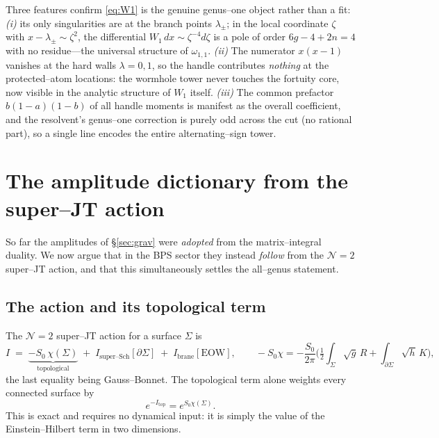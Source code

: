\documentclass[11pt]{article}
\begin{document}
Three features confirm \eqref{eq:W1} is the genuine genus--one object rather than a fit:
\emph{(i)} its only singularities are at the branch points $\lambda_\pm$; in the local coordinate
$\zeta$ with $x-\lambda_\pm\sim\zeta^2$, the differential $W_1\,dx\sim\zeta^{-4}d\zeta$ is a pole of
order $6g-4+2n=4$ with no residue---the universal structure of $\omega_{1,1}$.
\emph{(ii)} The numerator $x(x-1)$ vanishes at the hard walls $\lambda=0,1$, so the handle
contributes \emph{nothing} at the protected--atom locations: the wormhole tower never touches the
fortuity core, now visible in the analytic structure of $W_1$ itself.
\emph{(iii)} The common prefactor $b(1-a)(1-b)$ of all handle moments is manifest as the overall
coefficient, and the resolvent's genus--one correction is purely odd across the cut (no rational
part), so a single line encodes the entire alternating--sign tower.

\section{The amplitude dictionary from the super--JT action}
\label{sec:action}

So far the amplitudes of \S\ref{sec:grav} were \emph{adopted} from the matrix--integral duality.
We now argue that in the BPS sector they instead \emph{follow} from the $\mathcal N{=}2$ super--JT
action, and that this simultaneously settles the all--genus statement.

\subsection{The action and its topological term}
The $\mathcal N{=}2$ super--JT action for a surface $\Sigma$ is
\begin{equation}
  I \;=\; \underbrace{-S_0\,\chi(\Sigma)}_{\text{topological}}
  \;+\; I_{\text{super--Sch}}[\partial\Sigma]
  \;+\; I_{\text{brane}}[\text{EOW}],
  \qquad
  -S_0\chi=-\frac{S_0}{2\pi}\Big(\tfrac12\!\int_\Sigma\!\sqrt g\,R+\!\int_{\partial\Sigma}\!\!\sqrt h\,K\Big),
  \label{eq:action}
\end{equation}
the last equality being Gauss--Bonnet. The topological term alone weights every connected surface by
\begin{equation}
  e^{-I_{\text{top}}}=e^{S_0\chi(\Sigma)} .
  \label{eq:eSchi}
\end{equation}
This is exact and requires no dynamical input: it is simply the value of the Einstein--Hilbert term
in two dimensions.
\end{document}
